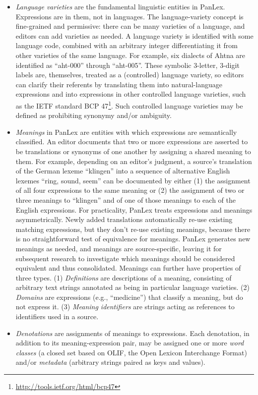 \documentclass[sw]{iosart2c}
\begin{document}
\begin{itemize}
    \item \emph {Language varieties} are the fundamental linguistic entities in PanLex. Expressions are in them, not in languages. The language-variety concept is fine-grained and permissive: there can be many varieties of a language, and editors can add varieties as needed. A language variety is identified with some language code, combined with an arbitrary integer differentiating it from other varieties of the same language. For example, six dialects of Ahtna are identified as ``aht-000'' through ``aht-005''. These symbolic 3-letter, 3-digit labels are, themselves, treated as a (controlled) language variety, so editors can clarify their referents by translating them into natural-language expressions and into expressions in other controlled language varieties, such as the IETF standard BCP 47\footnote{\url{http://tools.ietf.org/html/bcp47}}. Such controlled language varieties may be defined as prohibiting synonymy and/or ambiguity.
    \item \emph{Meanings} in PanLex are entities with which expressions are semantically classified. An editor documents that two or more expressions are asserted to be translations or synonyms of one another by assigning a shared meaning to them. For example, depending on an editor's judgment, a source's translation of the German lexeme ``klingen'' into a sequence of alternative English lexemes ``ring, sound, seem'' can be documented by either (1) the assignment of all four expressions to the same meaning or (2) the assignment of two or three meanings to ``klingen'' and of one of those meanings to each of the English expressions. For practicality, PanLex treats expressions and meanings asymmetrically. Newly added translations automatically re-use existing matching expressions, but they don't re-use existing meanings, because there is no straightforward test of equivalence for meanings. PanLex generates new meanings as needed, and meanings are source-specific, leaving it for subsequent research to investigate which meanings should be considered equivalent and thus consolidated. Meanings can further have properties of three types. (1) \emph{Definitions} are descriptions of a meaning, consisting of arbitrary text strings annotated as being in particular language varieties. (2) \emph{Domains} are expressions (e.g., ``medicine'') that classify a meaning, but do not express it. (3) \emph{Meaning identifiers} are strings acting as references to identifiers used in a source.
    \item \emph{Denotations} are assignments of meanings to expressions. Each denotation, in addition to its meaning-expression pair, may be assigned one or more \emph{word classes} (a closed set based on OLIF, the Open Lexicon Interchange Format) and/or \emph{metadata} (arbitrary strings paired as keys and values).

\end{itemize}
\end{document}

